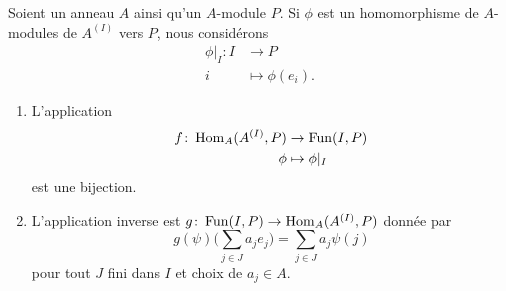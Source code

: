 \begin{theorem}      \label{THOooPDZCooJnHbOd}
    Soient un anneau \( A\) ainsi qu'un \( A\)-module \( P\). Si \( \phi \) est un homomorphisme de \( A \)-modules de \(A^{(I)}\) vers \(P\), nous considérons
    \begin{equation}
        \begin{aligned}
            \phi|_I\colon I&\to P \\
            i&\mapsto \phi(e_i). 
        \end{aligned}
    \end{equation}
    \begin{enumerate}
        \item
            
    L'application
    \begin{equation}
        \begin{aligned}
            f\colon \operatorname{Hom}_A(A^{(I)},P)&\to \operatorname{Fun}(I,P) \\
            \phi&\mapsto \phi|_I 
        \end{aligned}
    \end{equation}
    est une bijection.
\item
    L'application inverse est \( g\colon \operatorname{Fun}(I,P)\to \operatorname{Hom}_A(A^{(I)},P) \) donnée par
    \begin{equation}
        g(\psi)\big( \sum_{j\in J}a_je_j \big)=\sum_{j\in J}a_j\psi(j)
    \end{equation}
    pour tout \( J\) fini dans \( I\) et choix de \( a_j\in A\).
    \end{enumerate}
\end{theorem}

